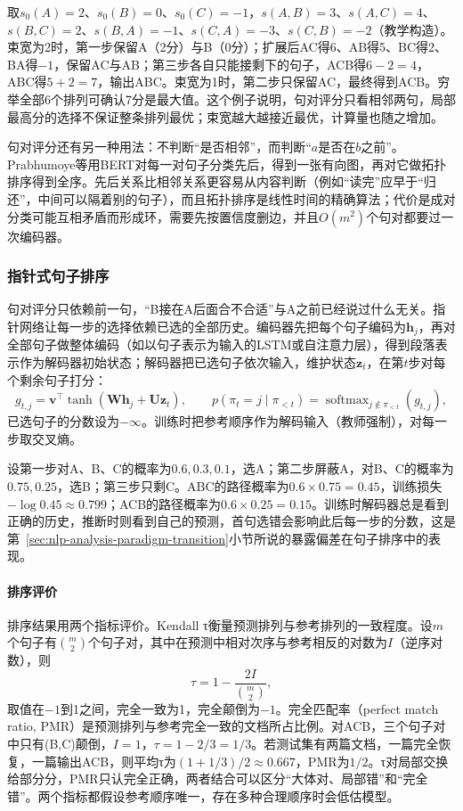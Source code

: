 取$s_0(A)=2$、$s_0(B)=0$、$s_0(C)=-1$，$s(A,B)=3$、$s(A,C)=4$、$s(B,C)=2$、$s(B,A)=-1$、$s(C,A)=-3$、$s(C,B)=-2$（教学构造）。束宽为2时，第一步保留A（2分）与B（0分）；扩展后AC得6、AB得5、BC得2、BA得$-1$，保留AC与AB；第三步各自只能接剩下的句子，ACB得$6-2=4$，ABC得$5+2=7$，输出ABC。束宽为1时，第二步只保留AC，最终得到ACB。穷举全部6个排列可确认7分是最大值。这个例子说明，句对评分只看相邻两句，局部最高分的选择不保证整条排列最优；束宽越大越接近最优，计算量也随之增加。

句对评分还有另一种用法：不判断“是否相邻”，而判断“$a$是否在$b$之前”。Prabhumoye等用BERT对每一对句子分类先后，得到一张有向图，再对它做拓扑排序得到全序。先后关系比相邻关系更容易从内容判断（例如“读完”应早于“归还”，中间可以隔着别的句子），而且拓扑排序是线性时间的精确算法；代价是成对分类可能互相矛盾而形成环，需要先按置信度删边，并且$O(m^2)$个句对都要过一次编码器。

\subsubsection{指针式句子排序}
\label{sec:nlp-analysis-pointer-ordering}

句对评分只依赖前一句，“B接在A后面合不合适”与A之前已经说过什么无关。指针网络让每一步的选择依赖已选的全部历史。编码器先把每个句子编码为$\bm h_j$，再对全部句子做整体编码（如以句子表示为输入的LSTM或自注意力层），得到段落表示作为解码器初始状态；解码器把已选句子依次输入，维护状态$\bm z_t$，在第$t$步对每个剩余句子打分：
\[
  g_{t,j}=\bm v^{\top}\tanh(\bm W\bm h_j+\bm U\bm z_t),\qquad
  p(\pi_t=j\mid\pi_{<t})=\operatorname{softmax}_{j\notin\pi_{<t}}(g_{t,j}),
\]
已选句子的分数设为$-\infty$。训练时把参考顺序作为解码输入（教师强制），对每一步取交叉熵。

设第一步对A、B、C的概率为$0.6,0.3,0.1$，选A；第二步屏蔽A，对B、C的概率为$0.75,0.25$，选B；第三步只剩C。ABC的路径概率为$0.6\times0.75=0.45$，训练损失$-\log0.45\approx0.799$；ACB的路径概率为$0.6\times0.25=0.15$。训练时解码器总是看到正确的历史，推断时则看到自己的预测，首句选错会影响此后每一步的分数，这是第~\ref{sec:nlp-analysis-paradigm-transition}小节所说的暴露偏差在句子排序中的表现。

\paragraph{排序评价}
排序结果用两个指标评价。Kendall τ衡量预测排列与参考排列的一致程度。设$m$个句子有$\binom m2$个句子对，其中在预测中相对次序与参考相反的对数为$I$（逆序对数），则
\begin{equation}
  \tau=1-\frac{2I}{\binom m2},
  \label{eq:nlp-analysis-kendall-tau}
\end{equation}
取值在$-1$到1之间，完全一致为1，完全颠倒为$-1$。完全匹配率（perfect match ratio, PMR）是预测排列与参考完全一致的文档所占比例。对ACB，三个句子对中只有(B,C)颠倒，$I=1$，$\tau=1-2/3=1/3$。若测试集有两篇文档，一篇完全恢复，一篇输出ACB，则平均τ为$(1+1/3)/2\approx0.667$，PMR为$1/2$。τ对局部交换给部分分，PMR只认完全正确，两者结合可以区分“大体对、局部错”和“完全错”。两个指标都假设参考顺序唯一，存在多种合理顺序时会低估模型。

